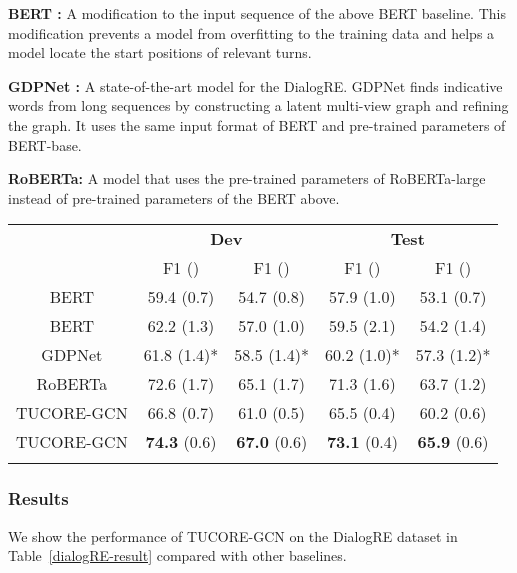 \documentclass[11pt]{article}
\begin{document}
\textbf{BERT \citep{yu-etal-2020-dialogue}:} A modification to the input sequence of the above BERT baseline. This modification prevents a model from overfitting to the training data and helps a model locate the start positions of relevant turns. 

\textbf{GDPNet \citep{DBLP:conf/aaai/XueSZC21}:} A state-of-the-art model for the DialogRE. GDPNet finds indicative words from long sequences by constructing a latent multi-view graph and refining the graph. It uses the same input format of BERT and pre-trained parameters of BERT-base. 

\textbf{RoBERTa:} A model that uses the pre-trained parameters of RoBERTa-large \citep{liu2019roberta} instead of pre-trained parameters of the BERT above.

\begin{table*}
\centering
{\small
\begin{tabular}{c|cc|cc}
\Xhline{3\arrayrulewidth}
\multirow{2}{*}{\textbf{Method}} & \multicolumn{2}{c|}{\textbf{Dev}} & \multicolumn{2}{c}{\textbf{Test}} \\
& F1 () & F1 () & F1 () & F1 () \\
\hline
BERT & 59.4 (0.7) & 54.7 (0.8) & 57.9 (1.0) & 53.1 (0.7) \\
BERT & 62.2 (1.3) & 57.0 (1.0) & 59.5 (2.1) & 54.2 (1.4) \\
GDPNet & 61.8 (1.4)* & 58.5 (1.4)* & 60.2 (1.0)* & 57.3 (1.2)* \\
RoBERTa & 72.6 (1.7) & 65.1 (1.7) & 71.3 (1.6) & 63.7 (1.2) \\
\hline
TUCORE-GCN & 66.8 (0.7) & 61.0 (0.5) & 65.5 (0.4) & 60.2 (0.6) \\
TUCORE-GCN & \textbf{74.3} (0.6) & \textbf{67.0} (0.6) & \textbf{73.1} (0.4) & \textbf{65.9} (0.6) \\
\Xhline{3\arrayrulewidth}
\end{tabular}
}
\caption{\label{dialogRE-result} Performance on DialogRE. The scores marked by “*” are based on our re-implementation, because of the data differences.}
\end{table*}


\subsubsection{Results}
We show the performance of TUCORE-GCN on the DialogRE dataset in Table~\ref{dialogRE-result} compared with other baselines.
\end{document}
